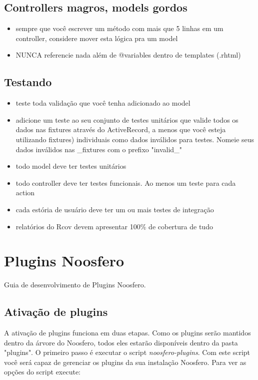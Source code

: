 \documentclass[11pt]{article}
\begin{document}
\subsection{Controllers magros, models gordos}

\begin{itemize}
  \item sempre que você escrever um método com mais que 5 linhas em um
    controller, considere mover esta lógica pra um model
  \item NUNCA referencie nada além de @variables dentro de templates (.rhtml)
\end{itemize}

\subsection{Testando}

\begin{itemize}
  \item teste toda validação que você tenha adicionado ao model
  \item adicione um teste ao seu conjunto de testes unitários que valide todos
    os dados nas fixtures através do ActiveRecord, a menos que você esteja
    utilizando fixtures) individuais como dados inválidos para testes. Nomeie
    seus dados inválidos nas \_fixtures com o prefixo "invalid\_"
  \item todo model deve ter testes unitários
  \item todo controller deve ter testes funcionais. Ao menos um teste para
    cada action
  \item cada estória de usuário deve ter um ou mais testes de integração
  \item relatórios do Rcov devem apresentar 100\% de cobertura de tudo
\end{itemize}

\section{Plugins Noosfero}

Guia de desenvolvimento de Plugins Noosfero.


\subsection{Ativação de plugins}

A ativação de plugins funciona em duas etapas. Como os plugins serão mantidos
dentro da árvore do Noosfero, todos eles estarão disponíveis dentro da pasta
"plugins". O primeiro passo é executar o script {\it noosfero-plugins}. Com este
script você será capaz de gerenciar os plugins da sua instalação Noosfero.
Para ver as opções do script execute:
\end{document}
